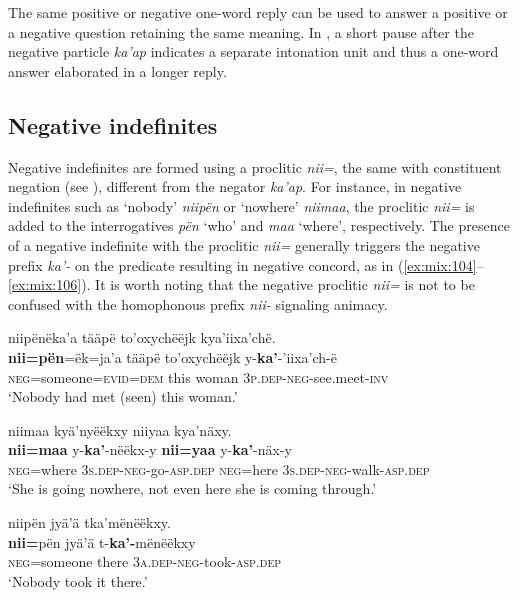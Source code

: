 \documentclass[output=paper,colorlinks,citecolor=brown,draft]{langscibook}
\begin{document}
The same positive or negative one-word reply can be used to answer a positive or a negative question retaining the same meaning. In , a short pause after the negative particle \textit{ka’ap} indicates a separate intonation unit and thus a one-word answer elaborated in a longer reply. 

\subsection{Negative indefinites}\label{sec:mix:3.2}

Negative indefinites are formed using a proclitic \textit{nii=}, the same with constituent negation (see ), different from the negator \textit{ka’ap}. For instance, in negative indefinites such as ‘nobody’ \textit{niipën} or ‘nowhere’ \textit{niimaa}, the proclitic \textit{nii=} is added to the interrogatives \textit{pën} ‘who’ and \textit{maa} ‘where’, respectively. The presence of a negative indefinite with the proclitic \textit{nii=} generally triggers the negative prefix \textit{ka’-} on the predicate resulting in negative concord, as in (\ref{ex:mix:104}--\ref{ex:mix:106}). It is worth noting that the negative proclitic \textit{nii=} is not to be confused with the homophonous prefix \textit{nii-} signaling animacy.

\ea\label{ex:mix:104}
    \glll niipënëka’a tääpë to’oxychëëjk kya’iixa’chë. \\
          \textbf{nii=pën}=ëk=ja’a tääpë to’oxychëëjk y-\textbf{ka’}{}-’iixa’ch-ë \\
          \textsc{neg=}someone=\textsc{evid=dem} this woman \textsc{3p.dep-neg-}see.meet-\textsc{inv} \\
    \glt ‘Nobody had met (seen) this woman.’
\z

\ea\label{ex:mix:105}
    \glll niimaa kyä’nyëëkxy niiyaa kya’näxy. \\
          \textbf{nii=maa} y-\textbf{ka’}{}-nëëkx-y \textbf{nii=yaa} y-\textbf{ka’}{}-näx-y \\
          \textsc{neg=}where 3\textsc{s.dep-neg}{}-go-\textsc{asp.dep} \textsc{neg=}here 3\textsc{s.dep-neg}{}-walk\textsc{{}-asp.dep } \\ %
    \glt ‘She is going nowhere, not even here she is coming through.’
\z

\ea\label{ex:mix:106}
    \glll niipën jyä’ä tka’mënëëkxy. \\
          \textbf{nii=}pën jyä’ä t-\textbf{ka’-}mënëëkxy \\
          \textsc{neg}=someone there \textsc{3a.dep-neg}{}-took-\textsc{asp.dep} \\
    \glt ‘Nobody took it there.’ 
\z
\end{document}
